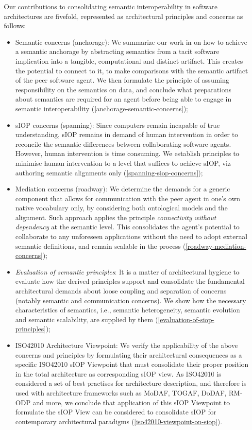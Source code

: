 \documentclass[sort&compress,preprint,authoryear,3p,twocolumn]{elsarticle}
\providecommand{\tightlist}{%
  \setlength{\itemsep}{0pt}\setlength{\parskip}{0pt}}
\begin{document}
Our contributions to consolidating semantic interoperability in software
architectures are fivefold, represented as architectural principles and
concerns as follows:

\begin{itemize}
\tightlist
\item
  Semantic concerns (anchorage): We summarize our work in
  \citep{Brandt2021a} on how to achieve a semantic anchorage by
  abstracting semantics from a tacit software implication into a
  tangible, computational and distinct artifact. This creates the
  potential to connect to it, to make comparisons with the semantic
  artifact of the peer software agent. We then formulate the principle
  of assuming responsibility on the semantics on data, and conclude what
  preparations about semantics are required for an agent before being
  able to engage in semantic interoperability
  (\cref{anchorage-semantic-concerns});
\item
  sIOP concerns (spanning): Since computers remain incapable of true
  understanding, sIOP remains in demand of human intervention in order
  to reconcile the semantic differences between collaborating software
  agents. However, human intervention is time consuming. We establish
  principles to minimise human intervention to a level that suffices to
  achieve sIOP, viz authoring semantic alignments only
  (\cref{spanning-siop-concerns});
\item
  Mediation concerns (roadway): We determine the demands for a generic
  component that allows for communication with the peer agent in one's
  own native vocabulary only, by considering both ontological models and
  the alignment. Such approach applies the principle \emph{connectivity
  without dependency} at the semantic level. This consolidates the
  agent's potential to collaborate to any unforeseen applications
  without the need to adopt external semantic definitions, and remain
  scalable in the process (\cref{roadway-mediation-concerns});
\item
  \emph{Evaluation of semantic principles}: It is a matter of
  architectural hygiene to evaluate how the derived principles support
  and consolidate the fundamental architectural demands about loose
  coupling and separation of concerns (notably semantic and
  communication concerns). We show how the necessary characteristics of
  semantics, i.e., semantic heterogeneity, semantic evolution and
  semantic scalability, are supplied by them
  (\cref{evaluation-of-siop-principles});
\item
  ISO42010 Architecture Viewpoint: We verify the applicability of the
  above concerns and principles by formulating their architectural
  consequences as a specific ISO42010 sIOP Viewpoint that must
  consolidate their proper position in the total architecture as
  corresponding sIOP view. As ISO42010 is considered a set of best
  practises for architecture description, and therefore is used with
  architecture frameworks such as MoDAF, TOGAF, DoDAF, RM-ODP and more,
  we conclude that application of this sIOP Viewpoint to formulate the
  sIOP View can be considered to consolidate sIOP for contemporary
  architectural paradigms (\cref{iso42010-viewpoint-on-siop}).
\end{itemize}
\end{document}
